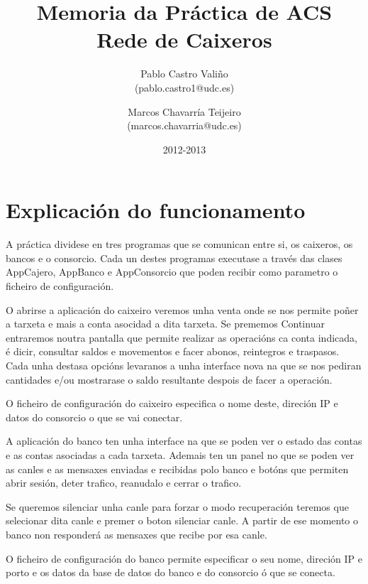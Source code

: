 \documentclass[a4paper,titlepage]{article}
\begin{document}
\title{\Huge{Memoria da Práctica de ACS} \\ \small{Rede de Caixeros}}
\author{Pablo Castro Valiño \\ \small{(pablo.castro1@udc.es)} \and
Marcos Chavarría Teijeiro \\ \small{(marcos.chavarria@udc.es)}}
\date{2012-2013}
\maketitle

\tableofcontents

\newpage

\section {Explicación do funcionamento}
A práctica dividese en tres programas que se comunican entre si, os caixeros, os bancos e o consorcio. Cada un destes programas executase a través das clases AppCajero, AppBanco e AppConsorcio que poden recibir como parametro o ficheiro de configuración.

O abrirse a aplicación do caixeiro veremos unha venta onde se nos permite poñer a tarxeta e mais a conta asocidad a dita tarxeta. Se prememos Continuar entraremos noutra pantalla que permite realizar as operacións ca conta indicada, é dicir, consultar saldos e movementos e facer abonos, reintegros e traspasos. Cada unha destasa opcións levaranos a unha interface nova na que se nos pediran cantidades e/ou mostrarase o saldo resultante despois de facer a operación.

O ficheiro de configuración do caixeiro especifica o nome deste, direción IP e datos do consorcio o que se vai conectar.

A aplicación do banco ten unha interface na que se poden ver o estado das contas e as contas asociadas a cada tarxeta. Ademais ten un panel no que se poden ver as canles e as mensaxes enviadas e recibidas polo banco e botóns que permiten abrir sesión, deter trafico, reanudalo e cerrar o trafico.

Se queremos silenciar unha canle para forzar o modo recuperación teremos que selecionar dita canle e premer o boton silenciar canle. A partir de ese momento o banco non responderá as mensaxes que recibe por esa canle.

O ficheiro de configuración do banco permite especificar o seu nome, direción IP e porto e os datos da base de datos do banco e do consorcio ó que se conecta.
\end{document}
